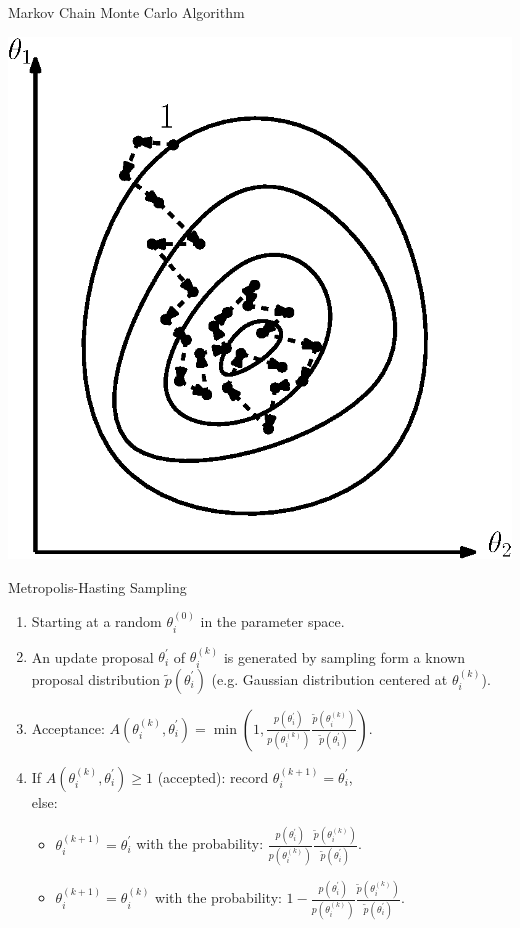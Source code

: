 \documentclass[xcolor=dvipsnames]{beamer}
\begin{document}
\begin{frame}[t]{Markov Chain Monte Carlo Algorithm}
  \begin{center}
  \includegraphics[height=0.8\textheight]{./image/mcmc.eps}
\end{center}
\end{frame}

\begin{frame}[t]{Metropolis-Hasting Sampling}
  \begin{enumerate}
    \item Starting at a random $\theta_i^{(0)}$ in the parameter space.
    \item An update proposal $\theta_i^{\prime}$ of $\theta_i^{(k)}$ is generated by sampling form a known proposal distribution $\tilde{p}(\theta_i^{\prime})$ (e.g. Gaussian distribution centered at $\theta_i^{(k)}$).
    \item Acceptance: $A(\theta_i^{(k)}, \theta_i^{\prime}) = \min{\left( 1, \frac{p(\theta_i^{\prime})}{p(\theta_i^{(k)})} \frac{\tilde{p}(\theta_i^{(k)})}{\tilde{p}(\theta_i^{\prime})} \right)}$.
    \item If $A(\theta_i^{(k)}, \theta_i^{\prime}) \ge 1$ (accepted): record $\theta_i^{(k+1)} = \theta_i^{\prime}$, \\
    else:
    \begin{itemize}
      \item $\theta_i^{(k+1)} = \theta_i^{\prime}$ with the probability: $\frac{p(\theta_i^{\prime})}{p(\theta_i^{(k)})} \frac{\tilde{p}(\theta_i^{(k)})}{\tilde{p}(\theta_i^{\prime})}$.
      \item $\theta_i^{(k+1)} = \theta_i^{(k)}$ with the probability: $1 - \frac{p(\theta_i^{\prime})}{p(\theta_i^{(k)})} \frac{\tilde{p}(\theta_i^{(k)})}{\tilde{p}(\theta_i^{\prime})}$.
    \end{itemize}
  \end{enumerate}
\end{frame}
\end{document}
